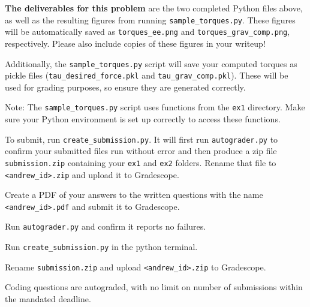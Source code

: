 \documentclass{16384_doc}
\begin{document}
\begin{questions}
\textbf{The deliverables for this problem} are the two completed Python files above,
as well as the resulting figures from running \verb!sample_torques.py!. These
figures will be automatically saved as \verb!torques_ee.png! and \verb!torques_grav_comp.png!,
respectively. Please also include copies of these figures in your writeup!

Additionally, the \verb!sample_torques.py! script will save your computed torques
as pickle files (\verb!tau_desired_force.pkl! and \verb!tau_grav_comp.pkl!).
These will be used for grading purposes, so ensure they are generated correctly.

Note: The \verb!sample_torques.py! script uses functions from the \verb!ex1! directory.
Make sure your Python environment is set up correctly to access these functions.


    To submit, run \verb!create_submission.py!.  It will first run \verb!autograder.py! to confirm your submitted files run without error and then produce a zip file \verb|submission.zip| containing your \verb!ex1! and \verb!ex2! folders. Rename that file to \verb!<andrew_id>.zip! and upload it to Gradescope.

\end{questions}

\begin{submissionChecklist}
        \item Create a PDF of your answers to the written questions with the name \verb!<andrew_id>.pdf! and submit it to Gradescope.
        \item Run \verb!autograder.py! and confirm it reports no failures.
        \item Run \verb!create_submission.py! in the python terminal.
        \item Rename \verb|submission.zip| and upload \verb!<andrew_id>.zip! to Gradescope.
        \item Coding questions are autograded, with no limit on number of submissions within the mandated deadline.
	\end{submissionChecklist}
\end{document}
